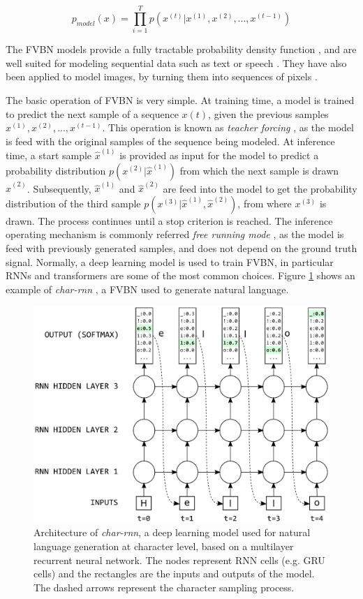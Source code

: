 \begin{equation}
	\label{eq:fvbn}
	p_{model}(x) = \prod_{i=1}^{T} p(x^{(t)}| x^{(1)}, x^{(2)}, ..., x^{(t-1)})
\end{equation}

The FVBN models provide a fully tractable probability density function \autocite{Goodfellow2016}, and are well suited for modeling sequential data such as text or speech \autocite{Wang2017,Shen2018,liu2019b}. They have also been applied to model images, by turning them into sequences of pixels \autocite{Oord2016, Oord2016b}.

The basic operation of FVBN is very simple. At training time, a model is trained to predict the next sample of a sequence $x(t)$, given the previous samples $ x^{(1)}, x^{(2)}, ..., x^{(t-1)}$. This operation is known as \textit{teacher forcing} \autocite{williams1989, Goodfellow2016, Goyal2016}, as the model is feed with the original samples of the sequence being modeled. At inference time, a start sample $\hat{x}^{(1)}$ is provided as input for the model to predict a probability distribution $p(x^{(2)}|\hat{x}^{(1)})$ from which the next sample is drawn $\hat{x}^{(2)}$. Subsequently, $ \hat{x}^{(1)}$ and $\hat{x}^{(2)}$ are feed into the model to get the probability distribution of the third sample $p(x^{(3)}|\hat{x}^{(1)}, \hat{x}^{(2)})$, from where $x^{(3)}$ is drawn. The process continues until a stop criterion is reached. The inference operating mechanism is commonly referred \textit{free running mode} \autocite{Goodfellow2016}, as the model is feed with previously generated samples, and does not depend on the ground truth signal. Normally, a deep learning model is used to train FVBN, in particular RNNs and transformers are some of the most common choices. Figure \ref{fig:charrnn} shows an example of \textit{char-rnn} \autocite{Sutskever2011, Graves2013}, a FVBN used to generate natural language. 

\begin{figure}
	\centering
	\includegraphics[width=0.8\linewidth]{background/images/char_rnn}
	\caption[\textit{Char-rnn} architecture]{Architecture of \textit{char-rnn}, a deep learning model used for natural language generation at character level, based on a multilayer recurrent neural network. The nodes represent RNN cells (e.g. GRU cells) and the rectangles are the inputs and outputs of the model. The dashed arrows represent the character sampling process.}
	\label{fig:charrnn}
\end{figure}


